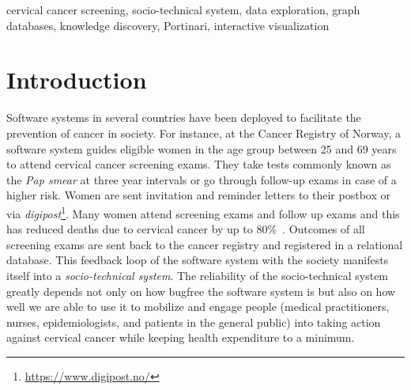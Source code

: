 \documentclass[10pt, conference]{IEEEtran}
\begin{document}
\begin{IEEEkeywords}
cervical cancer screening, socio-technical system, data exploration, graph databases, knowledge discovery, Portinari, interactive visualization
\end{IEEEkeywords}


\IEEEpeerreviewmaketitle

\section{Introduction}
\label{sec:intro}

Software systems in several countries have been deployed to facilitate the prevention of cancer in society. For instance, at the Cancer Registry of Norway, a software system guides eligible women in the age group between 25 and 69 years to attend cervical cancer screening exams. They take tests commonly known as the \emph{Pap smear} at three year intervals or go through follow-up exams in  case of a higher risk. Women are  sent invitation  and reminder letters to their postbox or via \emph{digipost}\footnote{\url{https://www.digipost.no/}}. Many women  attend screening exams and follow up exams and this has reduced deaths due to cervical cancer by up to 80\%~\cite{CervicalScreeningEU2}. Outcomes of all screening exams are sent back to the cancer registry and registered in a relational database. This feedback loop of the software system with the society manifests itself into a \emph{socio-technical system}. The reliability of the socio-technical system greatly depends not only on how bugfree the software system is but also on how well we are able to use it to mobilize and engage people (medical practitioners, nurses, epidemiologists, and patients in the general public) into taking action against cervical cancer while keeping health expenditure to a minimum.
\end{document}
